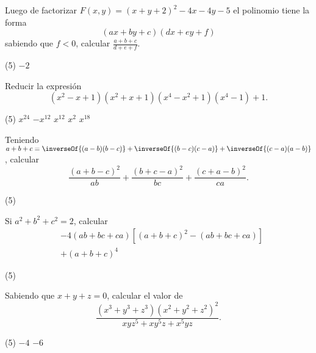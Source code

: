 \begin{multicols}{2}
    \begin{exercise}
        Luego de factorizar $F(x,y) = (x + y + 2)^2 - 4x - 4y - 5$ el polinomio tiene la forma
        \[
            (ax + by + c)(dx + ey + f)
        \]
        sabiendo que $f < 0$, calcular $\frac{a + b + c}{d + e + f}$.
        \begin{tasks}(5)
            \task $-2$
        \end{tasks}
    \end{exercise}

    \begin{exercise}
        Reducir la expresión
        \[
            (x^2 - x + 1)(x^2 + x + 1)(x^4 - x^2 + 1)(x^4 - 1) + 1.
        \]
        \begin{tasks}(5)
            \task $x^{24}$
            \task $-x^{12}$
            \task $x^{12}$
            \task $x^2$
            \task $x^{18}$
        \end{tasks}
    \end{exercise}

    \begin{exercise}
        Teniendo $a + b + c = \inverseOf{(a - b)(b - c)} + \inverseOf{(b - c)(c - a)} + \inverseOf{(c - a)(a - b)}$, calcular
        \[
            \frac{(a + b - c)^2}{ab} + \frac{(b + c - a)^2}{bc} + \frac{(c + a - b)^2}{ca}.
        \]
        \begin{tasks}(5)
        \end{tasks}
    \end{exercise}

    \begin{exercise}
        Si $a^2 + b^2 + c^2 = 2$, calcular
        \begin{align*}
            &- 4(ab + bc + ca)[(a + b + c)^2 - (ab + bc + ca)]\\
            &+ (a + b + c)^4
        \end{align*}
        \begin{tasks}(5)
        \end{tasks}
    \end{exercise}

    \begin{exercise}
        Sabiendo que $x + y + z = 0$, calcular el valor de
        \[
            \frac{(x^3 + y^3 + z^3)(x^2 + y^2 + z^2)^2}{xyz^5 + xy^5 z + x^5 yz}.
        \]
        \begin{tasks}(5)
            \task $-4$
            \task $-6$
        \end{tasks}
    \end{exercise}


\end{multicols}
